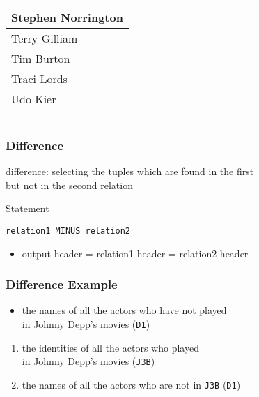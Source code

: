 \documentclass[dvipsnames]{beamer}
\theoremstyle{plain}
\begin{document}
\begin{frame}[fragile]
\begin{example}
\begin{columns}[b]
      \begin{tiny}
      \begin{table}
        \begin{tabular}{|l|}\hline
Stephen Norrington   \\\hline
Terry Gilliam        \\\hline
Tim Burton           \\\hline
Traci Lords          \\\hline
Udo Kier             \\\hline
        \end{tabular}
      \end{table}
      \end{tiny}
    \end{columns}
  \end{example}
\end{frame}

\begin{frame}[fragile]
  \frametitle{Difference}

  \begin{definition}
    \alert{difference}: selecting the tuples which are found in the first\\
      but not in the second relation
  \end{definition}

  \pause
  \begin{block}{Statement}
    \begin{lstlisting}
relation1 MINUS relation2
    \end{lstlisting}
  \end{block}

  \pause
  \begin{itemize}
    \item output header = relation1 header = relation2 header
  \end{itemize}
\end{frame}

\begin{frame}
  \frametitle{Difference Example}

  \begin{example}
    \begin{itemize}
      \item the names of all the actors who have not played\\
        in Johnny Depp's movies (\texttt{D1})
    \end{itemize}

    \pause
    \begin{enumerate}
      \item the identities of all the actors who played\\
        in Johnny Depp's movies (\texttt{J3B})

      \pause
      \item the names of all the actors who are not in \texttt{J3B} (\texttt{D1})
    \end{enumerate}
  \end{example}
\end{frame}
\end{document}
